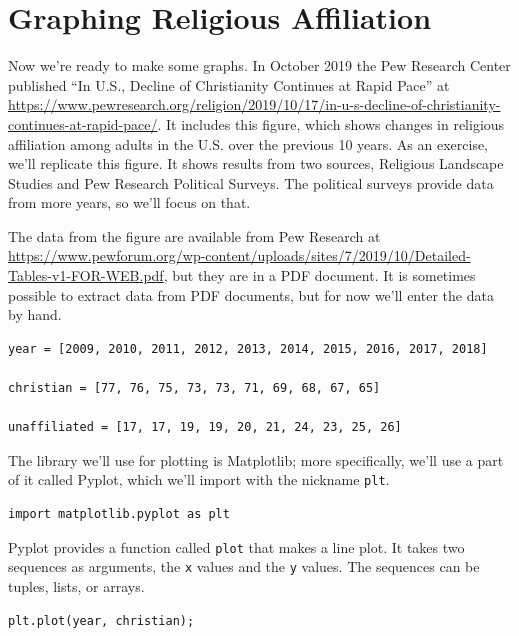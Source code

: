 \hypertarget{graphing-religious-affiliation}{%
\section{Graphing Religious
Affiliation}\label{graphing-religious-affiliation}}

Now we're ready to make some graphs. In October 2019 the Pew Research
Center published ``In U.S., Decline of Christianity Continues at Rapid
Pace'' at
\url{https://www.pewresearch.org/religion/2019/10/17/in-u-s-decline-of-christianity-continues-at-rapid-pace/}.
It includes this figure, which shows changes in religious affiliation
among adults in the U.S. over the previous 10 years.
As an exercise, we'll replicate this figure. It shows results from two
sources, Religious Landscape Studies and Pew Research Political Surveys.
The political surveys provide data from more years, so we'll focus on
that.

The data from the figure are available from Pew Research at
\url{https://www.pewforum.org/wp-content/uploads/sites/7/2019/10/Detailed-Tables-v1-FOR-WEB.pdf},
but they are in a PDF document. It is sometimes possible to extract data
from PDF documents, but for now we'll enter the data by hand.

\begin{lstlisting}[]
year = [2009, 2010, 2011, 2012, 2013, 2014, 2015, 2016, 2017, 2018]

christian = [77, 76, 75, 73, 73, 71, 69, 68, 67, 65]

unaffiliated = [17, 17, 19, 19, 20, 21, 24, 23, 25, 26]
\end{lstlisting}

The library we'll use for plotting is Matplotlib; more specifically,
we'll use a part of it called Pyplot, which we'll import with the
nickname \passthrough{\lstinline!plt!}.

\begin{lstlisting}[]
import matplotlib.pyplot as plt
\end{lstlisting}

Pyplot provides a function called \passthrough{\lstinline!plot!} that
makes a line plot. It takes two sequences as arguments, the
\passthrough{\lstinline!x!} values and the \passthrough{\lstinline!y!}
values. The sequences can be tuples, lists, or arrays.

\begin{lstlisting}[]
plt.plot(year, christian);
\end{lstlisting}

